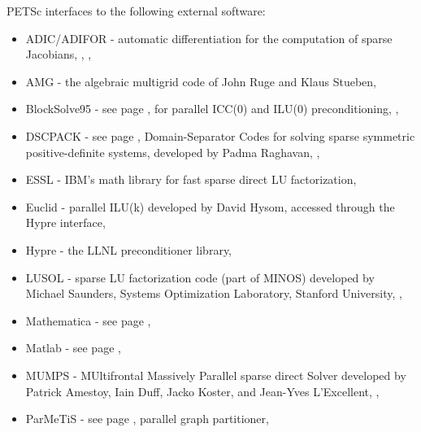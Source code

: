 \vspace{.3in}
\noindent
PETSc interfaces to the following external software:
\begin{itemize}
  \item ADIC/ADIFOR -  automatic differentiation for the computation of sparse Jacobians, 
                     ,
                     ,
  \item AMG -         the algebraic multigrid code of John Ruge and Klaus Stueben,
  \item BlockSolve95 - see page \pageref{sec_blocksolve}, for parallel ICC(0) and ILU(0) preconditioning,
                     ,
  \item DSCPACK -    see page \pageref{sec_externalsol}, Domain-Separator Codes for solving sparse symmetric
                      positive-definite systems, 
                     developed by Padma Raghavan,   
                     ,
  \item ESSL -         IBM's math library for fast sparse direct LU factorization,
  \item Euclid  -   parallel ILU(k) developed by David Hysom, accessed through the Hypre interface,
  \item Hypre -    the LLNL preconditioner library, 
  \item LUSOL -       sparse LU factorization code (part of MINOS) developed by Michael Saunders,
                      Systems Optimization Laboratory, Stanford University,
                     ,
  \item Mathematica -  see page \pageref{ch_mathematica},
  \item Matlab -      see page \pageref{ch_matlab},
  \item MUMPS -      MUltifrontal Massively Parallel sparse direct Solver developed by Patrick Amestoy, 
                     Iain Duff, Jacko Koster, and Jean-Yves L'Excellent,
                     ,
  \item ParMeTiS -     see page \pageref{sec_partitioning}, parallel graph partitioner,

\end{itemize}
